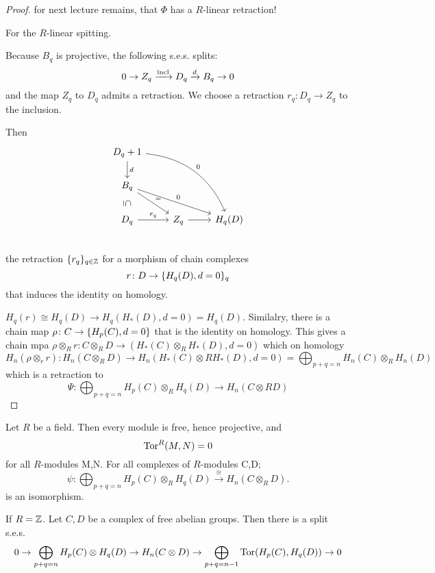 \documentclass[language=english]{TemplateLecture}
\begin{document}
\begin{proof}
    for next lecture remains, that \(\Phi\) has a \(R\)-linear retraction!


    For the \(R\)-linear spitting.

    Because \(B_q\) is projective, the following s.e.s. splits:
    \[0 \to Z_q \xrightarrow{\operatorname{incl}} D_q \xrightarrow{d}  B_q \to 0\]
    and the map \(Z_q\) to \(D_q\) admits a retraction. We choose a retraction \(r_q\colon D_q \to Z_q\) to the inclusion.

    Then
    \[\begin{tikzcd}
        D_q+1 \ar[d, "d"] \ar[rrdd, bend left, "0"] & & \\
        B_q  \ar[d, phantom, sloped, "\subseteq "] \ar[rrd, "0"] \ar[dr, "="] & & \\
        D_q \ar[r, "r_q"] & Z_q  \ar[r] & H_q(D) \\
    \end{tikzcd}\]
    the retraction \(\{r_q\}_{q \in \mathbb{Z}}\) for a morphism of chain complexes
    \[r\colon D \to \{H_q(D), d = 0\}_q\]
    that induces the identity on homology.

    \(H_q(r) \cong H_q(D) \to H_q(H_*(D), d= 0) = H_q(D)\).
    Similalry, there is a chain map \(\rho\colon C \to \{H_p(C), d = 0\}\) that is the identity on homology. This gives a chain mpa \(\rho \otimes_R r\colon C \otimes_R D \to (H_*(C) \otimes_R H_*(D), d= 0)\) which on homology
    \[H_n(\rho\otimes_r r) \colon H_n(C \otimes_R D) \to H_n(H_*(C) \otimes RH_*(D), d= 0) = \bigoplus_{p+q = n} H_n(C) \otimes_R H_n(D)\]
    which is a retraction to
    \[\Psi \colon \bigoplus_{p+q = n} H_p(C) \otimes_R H_q(D) \to H_n(C\otimes R D)\]

\end{proof}

\begin{example}
    Let \(R\) be a field. Then every module is free, hence projective, and
    \[\mathrm{Tor}^R(M,N) = 0\]
    for all \(R\)-modules M,N. For all complexes of \(R\)-modules C,D;
    \[\psi\colon \bigoplus_{p+q = n} H_p(C) \otimes_R H_q(D) \xrightarrow{\cong} H_n(C\otimes_R D).\]
    is an isomorphism.

    If \(R = \mathbb{Z}\). Let \(C,D\) be a complex of free abelian groups. Then there is a split s.e.s.
    \[0 \to \bigoplus_{p+q = n} H_p(C) \otimes H_q(D) \to H_n(C\otimes D) \to \bigoplus_{p+q = n-1} \mathrm{Tor}(H_p(C), H_q(D)) \to 0\]
\end{example}
\end{document}
